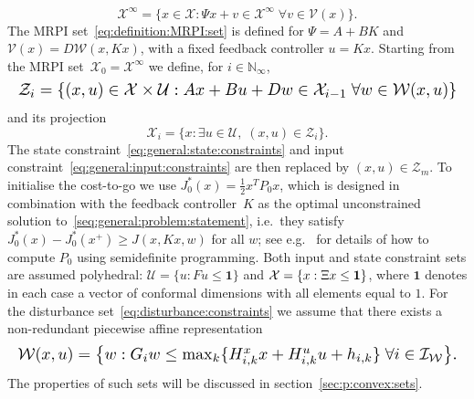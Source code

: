 \documentclass[journal]{IEEEtran}
\newcommand*{\Resize}[1]{\resizebox{\columnwidth}{!}{$#1$}}
\theoremstyle{remark}
\theoremstyle{definition}
\begin{document}
%
\begin{equation}\label{eq:definition:MRPI:set}
\mathcal X^\infty = \{x\in\mathcal X: \Psi x + v \in\mathcal X^\infty\;\forall v\in\mathcal V(x)\}.
\end{equation}
%
The MRPI set~\eqref{eq:definition:MRPI:set} is defined for $\Psi=A+BK$ and $\mathcal V(x) = D\mathcal W(x,Kx)$,
with a fixed feedback controller $u = Kx$.
%
Starting from the MRPI set~$\mathcal X_0=\mathcal X^\infty$ we define, for $i\in\mathbb N_\infty$,
%
\begin{equation}\label{eq:stage:constraints:in:x:and:u}
  \Resize{\mathcal Z_i = \{(x,u)\in\mathcal X\times \mathcal{U}: Ax + Bu + Dw \in\mathcal X_{i-1}\;\forall w\in\mathcal W(x,u)\}}
\end{equation}
%
and its projection
%
\begin{equation}
  \mathcal X_i = \{x:\exists u\in \mathcal{U}, \; (x,u)\in\mathcal Z_i\}.
\end{equation}
%
The state constraint~\eqref{eq:general:state:constraints} and input constraint~\eqref{eq:general:input:constraints}
are then replaced by $(x,u)\in\mathcal Z_m$.
%
To initialise the cost-to-go we use $J_0^\ast(x) = \frac{1}{2}x^T P_0x$, which is designed in combination with the feedback 
controller~$K$ as the optimal unconstrained solution to~\eqref{seq:general:problem:statement}, i.e.\ they satisfy
$J_0^\ast(x) - J_0^\ast(x^+)\geq J(x,Kx,w)$ for all $w$; see e.g.~\cite{Boyd:94} for details of how to compute $P_0$ using semidefinite programming.
%
Both input and state constraint sets are assumed polyhedral: $\mathcal{U}=\{u : F u \leq \mathbf{1}\}$ and $\mathcal X = \{x:\Xi x\leq \mathbf{1}\}$, where $\mathbf{1}$ denotes in each case a vector of conformal dimensions with all elements equal to $1$.
%
For the disturbance set~\eqref{eq:disturbance:constraints} we assume that there exists a non-redundant piecewise affine representation
%
\begin{equation}\label{eq:definition:disturbance:set:explicit}
  \Resize{\mathcal W(x,u) = \bigl\{w:G_i w\leq\max_{k}\{H_{i,k}^x x + H_{i,k}^uu + h_{i,k}\}\; \forall i\in\mathcal{I}_{\mathcal{W}}\bigr\}.}
\end{equation}
%
The properties of such sets will be discussed in section~\ref{sec:p:convex:sets}.
%
%
%
%
\end{document}
